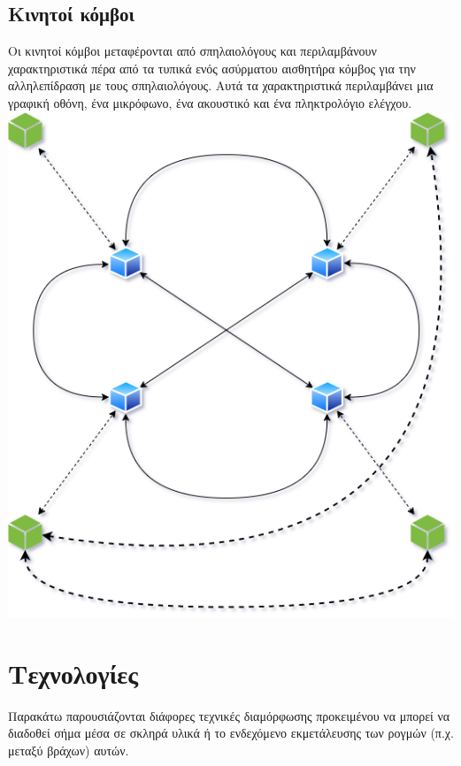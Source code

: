 \documentclass[12pt]{article}
\begin{document}
\begin{multicols}{2}
        \subsection{\small \textsf{Κινητοί κόμβοι}} { Οι
            κινητοί κόμβοι μεταφέρονται από σπηλαιολόγους
            και περιλαμβάνουν χαρακτηριστικά πέρα από τα
            τυπικά ενός ασύρματου αισθητήρα κόμβος για την
            αλληλεπίδραση με τους σπηλαιολόγους. Αυτά τα
            χαρακτηριστικά περιλαμβάνει μια γραφική οθόνη,
            ένα μικρόφωνο, ένα ακουστικό και ένα
            πληκτρολόγιο ελέγχου. }
        \includegraphics*[scale=.4]{img/ICWMSN-WMSNpng.png}

    \section{\normalsize  \textsf{Τεχνολογίες}} Παρακάτω
    παρουσιάζονται διάφορες τεχνικές διαμόρφωσης προκειμένου
    να μπορεί να διαδοθεί σήμα μέσα σε σκληρά υλικά ή το
    ενδεχόμενο εκμετάλευσης των ρογμών (π.χ. μεταξύ βράχων)
    αυτών.


\end{multicols}
\end{document}
